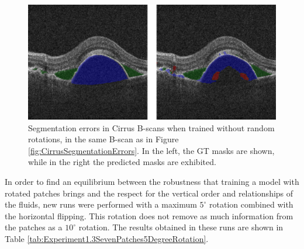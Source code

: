 \begin{figure}[!ht]
	\centering
	\includegraphics[width=0.7\linewidth]{figures/SegmentationErrorsNoRotation.png}
	\caption{Segmentation errors in Cirrus B-scans when trained without random rotations, in the same B-scan as in Figure \ref{fig:CirrusSegmentationErrors}. In the left, the GT masks are shown, while in the right the predicted masks are exhibited.}
	\label{fig:SegmentationErrorsNoRotation}
\end{figure}

In order to find an equilibrium between the robustness that training a model with rotated patches brings and the respect for the vertical order and relationships of the fluids, new runs were performed with a maximum $5^{\circ}$ rotation combined with the horizontal flipping. This rotation does not remove as much information from the patches as a $10^{\circ}$ rotation. The results obtained in these runs are shown in Table \ref{tab:Experiment1.3SevenPatches5DegreeRotation}.

